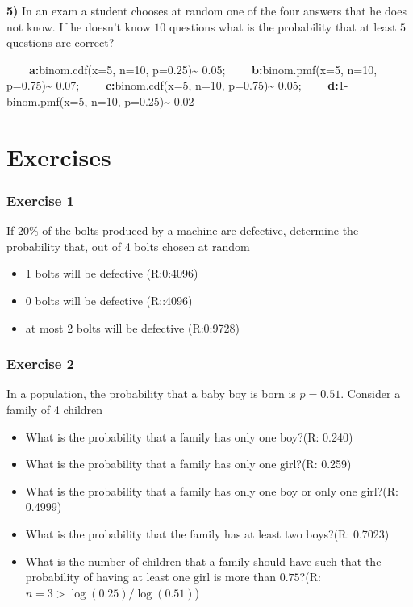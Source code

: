 \documentclass[
]{book}
\providecommand{\tightlist}{%
  \setlength{\itemsep}{0pt}\setlength{\parskip}{0pt}}
\begin{document}
\textbf{5)} In an exam a student chooses at random one of the four answers that he does not know. If he doesn't know \(10\) questions what is the probability that at least \(5\) questions are correct?

\textbf{\(\qquad\)a:}binom.cdf(x=5, n=10, p=0.25)\textasciitilde{} 0.05; \textbf{\(\qquad\)b:}binom.pmf(x=5, n=10, p=0.75)\textasciitilde{} 0.07; \textbf{\(\qquad\)c:}binom.cdf(x=5, n=10, p=0.75)\textasciitilde{} 0.05; \textbf{\(\qquad\)d:}1-binom.pmf(x=5, n=10, p=0.25)\textasciitilde{} 0.02

\hypertarget{exercises-5}{%
\section{Exercises}\label{exercises-5}}

\hypertarget{exercise-1-4}{%
\subsubsection{Exercise 1}\label{exercise-1-4}}

If 20\% of the bolts produced by a machine are defective, determine the probability that, out of
4 bolts chosen at random

\begin{itemize}
\tightlist
\item
  1 bolts will be defective (R:0:4096)
\item
  0 bolts will be defective (R::4096)
\item
  at most 2 bolts will be defective (R:0:9728)
\end{itemize}

\hypertarget{exercise-2-4}{%
\subsubsection{Exercise 2}\label{exercise-2-4}}

In a population, the probability that a baby boy is born is \(p=0.51\). Consider a family of 4 children

\begin{itemize}
\tightlist
\item
  What is the probability that a family has only one boy?(R: 0.240)
\item
  What is the probability that a family has only one girl?(R: 0.259)
\item
  What is the probability that a family has only one boy or only one girl?(R: 0.4999)
\item
  What is the probability that the family has at least two boys?(R: 0.7023)
\item
  What is the number of children that a family should have such that the probability of having at least one girl is more than \(0.75\)?(R:\(n=3>\log(0.25)/\log(0.51)\))
\end{itemize}
\end{document}
